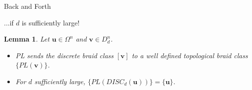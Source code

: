 \documentclass[9pt, english]{beamer}
\newtheorem{lem}[thm]{Lemma}
\theoremstyle{definition}
\newcommand{\simbolovettore}[1]{{\boldsymbol{#1}}}
\newcommand{\vu}{\simbolovettore{u}}
\newcommand{\vv}{\simbolovettore{v}}
\begin{document}
\begin{frame}{Back and Forth}
    \begin{block}{...if $d$ is sufficiently large!}
        \begin{lem}
            Let $\vu \in \Omega^n$ and $\vv \in D_d^n$.
            \begin{itemize}
            \item PL sends the discrete braid class $[\vv]$ to a well
            defined topological braid class $\{PL(\vv)\}$.
            \item For $d$ sufficiently large, $\{PL(DISC_d(\vu))\}=\{\vu\}$.
            \end{itemize}
            \end{lem}
    \end{block}
\end{frame}
\end{document}
